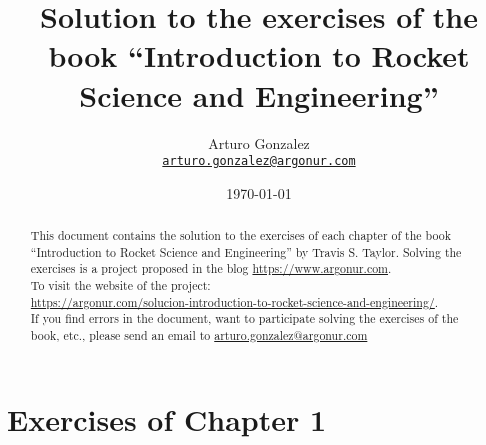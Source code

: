 \documentclass{article}
\begin{document}
\title{Solution to the exercises of the book ``Introduction to Rocket Science and Engineering''}
\author{Arturo Gonzalez\\
	\texttt{\href{mailto:arturo.gonzalez@argonur.com}{arturo.gonzalez@argonur.com}}}
\date{\today}
\maketitle

\begin{abstract}
This document contains the solution to the exercises of each chapter of the book ``Introduction to Rocket Science and Engineering'' by Travis S. Taylor. Solving the exercises is a project proposed in the blog \url{https://www.argonur.com}.\\

To visit the website of the project: \\
\url{https://argonur.com/solucion-introduction-to-rocket-science-and-engineering/}.\\

If you find errors in the document, want to participate solving the exercises of the book, etc., please send an email to \href{mailto:arturo.gonzalez@argonur.com}{arturo.gonzalez@argonur.com}
\end{abstract}

\cleardoublepage


%

\section{Exercises of Chapter 1}
\end{document}
